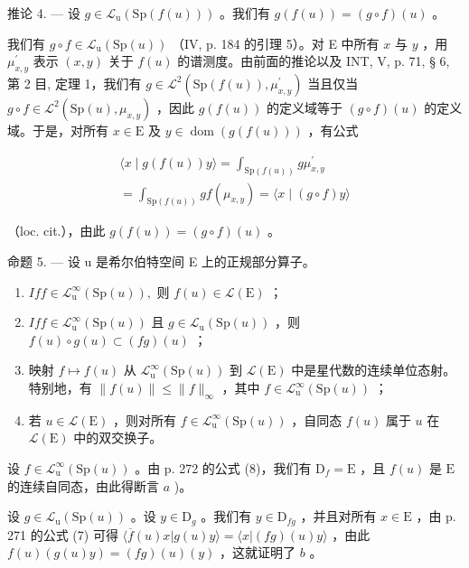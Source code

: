 推论 4. --- 设 \(g \in \mathcal{L}_{\mathrm{u}}(\mathrm{Sp}(f(u)))\) 。我们有 \(g(f(u)) = (g \circ f)(u)\) 。

我们有 \(g \circ f \in \mathcal{L}_{\mathrm{u}}(\mathrm{Sp}(u))\) （IV, p. 184 的引理 5）。对 E 中所有 \(x\) 与 \(y\) ，用 \(\mu_{x,y}^{\prime}\) 表示 \((x,y)\) 关于 \(f(u)\) 的谱测度。由前面的推论以及 INT, V, p. 71, § 6, 第 2 目, 定理 1，我们有 \(g \in \mathcal{L}^{2}(\mathrm{Sp}(f(u)), \mu_{x,y}^{\prime})\) 当且仅当 \(g \circ f \in \mathcal{L}^{2}(\mathrm{Sp}(u), \mu_{x,y})\) ，因此 \(g(f(u))\) 的定义域等于 \((g \circ f)(u)\) 的定义域。于是，对所有 \(x \in \mathrm{E}\) 及 \(y \in \operatorname{dom}(g(f(u)))\) ，有公式

\[
\begin{array}{c} \langle x \mid g (f (u)) y \rangle = \int_ {\mathrm{Sp} (f (u))} g \mu_ {x, y} ^ {\prime} \\ = \int_ {\mathrm{Sp} (f (u))} g f (\mu_ {x, y}) = \langle x \mid (g \circ f) y \rangle \end{array}
\]

（loc. cit.），由此 \(g(f(u)) = (g \circ f)(u)\) 。

命题 5. --- 设 u 是希尔伯特空间 E 上的正规部分算子。

\begin{enumerate}
\def\labelenumi{\alph{enumi})}
\item
  \(If f \in \mathcal{L}_{\mathrm{u}}^{\infty}(\mathrm{Sp}(u)),\) 则 \(f(u) \in \mathcal{L}(\mathrm{E})\) ；
\item
  \(If f \in \mathcal{L}_{\mathrm{u}}^{\infty}(\mathrm{Sp}(u))\) 且 \(g \in \mathcal{L}_{\mathrm{u}}(\mathrm{Sp}(u))\) ，则 \(f(u) \circ g(u) \subset (fg)(u)\) ；
\item
  映射 \(f \mapsto f(u)\) 从 \(\mathcal{L}_{\mathrm{u}}^{\infty}(\mathrm{Sp}(u))\) 到 \(\mathcal{L}(\mathrm{E})\) 中是星代数的连续单位态射。特别地，有 \(\|f(u)\|\leqslant\|f\|_{\infty}\) ，其中 \(f\in\mathcal{L}_{\mathrm{u}}^{\infty}(\mathrm{Sp}(u))\) ；
\item
  若 \(u \in \mathcal{L}(\mathrm{E})\) ，则对所有 \(f \in \mathcal{L}_{\mathrm{u}}^{\infty}(\mathrm{Sp}(u))\) ，自同态 \(f(u)\) 属于 \(u\) 在 \(\mathcal{L}(\mathrm{E})\) 中的双交换子。
\end{enumerate}

设 \(f \in \mathcal{L}_{\mathrm{u}}^{\infty}(\mathrm{Sp}(u))\) 。由 p. 272 的公式 (8)，我们有 \(\mathrm{D}_f = \mathrm{E}\) ，且 \(f(u)\) 是 \(\mathrm{E}\) 的连续自同态，由此得断言 \(a\) )。

设 \(g \in \mathcal{L}_{\mathrm{u}}(\mathrm{Sp}(u))\) 。设 \(y \in \mathrm{D}_g\) 。我们有 \(y \in \mathrm{D}_{fg}\) ，并且对所有 \(x \in \mathrm{E}\) ，由 p. 271 的公式 (7) 可得 \(\langle \overline{f}(u)x | g(u)y \rangle = \langle x | (fg)(u)y \rangle\) ，由此 \(f(u)(g(u)y) = (fg)(u)(y)\) ，这就证明了 \(b\) 。

